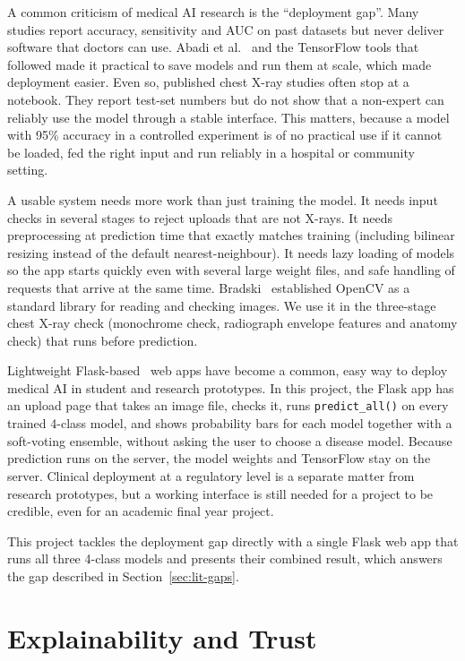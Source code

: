 A common criticism of medical AI research is the ``deployment gap''. Many studies report accuracy, sensitivity and AUC on past datasets but never deliver software that doctors can use. Abadi et al.~\cite{abadi2015} and the TensorFlow tools that followed made it practical to save models and run them at scale, which made deployment easier. Even so, published chest X-ray studies often stop at a notebook. They report test-set numbers but do not show that a non-expert can reliably use the model through a stable interface. This matters, because a model with 95\% accuracy in a controlled experiment is of no practical use if it cannot be loaded, fed the right input and run reliably in a hospital or community setting.

A usable system needs more work than just training the model. It needs input checks in several stages to reject uploads that are not X-rays. It needs preprocessing at prediction time that exactly matches training (including bilinear resizing instead of the default nearest-neighbour). It needs lazy loading of models so the app starts quickly even with several large weight files, and safe handling of requests that arrive at the same time. Bradski~\cite{bradski2000} established OpenCV as a standard library for reading and checking images. We use it in the three-stage chest X-ray check (monochrome check, radiograph envelope features and anatomy check) that runs before prediction.

Lightweight Flask-based~\cite{flask} web apps have become a common, easy way to deploy medical AI in student and research prototypes. In this project, the Flask app has an upload page that takes an image file, checks it, runs \texttt{predict\_all()} on every trained 4-class model, and shows probability bars for each model together with a soft-voting ensemble, without asking the user to choose a disease model. Because prediction runs on the server, the model weights and TensorFlow stay on the server. Clinical deployment at a regulatory level is a separate matter from research prototypes, but a working interface is still needed for a project to be credible, even for an academic final year project.

This project tackles the deployment gap directly with a single Flask web app that runs all three 4-class models and presents their combined result, which answers the gap described in Section~\ref{sec:lit-gaps}.

\section{Explainability and Trust}

